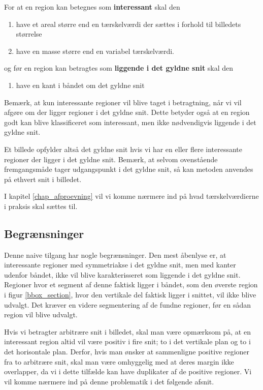 {\noindent For at en region kan betegnes som \textbf{interessant} skal den
\begin{enumerate}
        \renewcommand{\labelenumi}{(\alph{enumi})}
    \item have et areal større end en tærskelværdi der sættes i
        forhold til billedets størrelse
    \item have en masse større end en variabel tærskelværdi.
\end{enumerate}
og før en region kan betragtes som \textbf{liggende i det gyldne
snit} skal den
\begin{enumerate}
        \renewcommand{\labelenumi}{(\alph{enumi})}
        \setcounter{enumi}{2}
    \item have en kant i båndet om det gyldne snit
\end{enumerate}

Bemærk, at kun interessante regioner vil blive taget i betragtning, når vi vil
afgøre om der ligger regioner i det gyldne snit. Dette betyder også at
en region godt kan blive klassificeret som interessant, men ikke
nødvendigvis liggende i det gyldne snit.

Et billede opfylder altså det gyldne snit hvis vi har en eller flere
interessante regioner der ligger i det gyldne snit. Bemærk, at selvom
ovenstående fremgangsmåde tager udgangspunkt i det gyldne snit, så kan
metoden anvendes på ethvert snit i billedet.

I kapitel \ref{chap_afproevning} vil vi komme nærmere ind på hvad
tærskelværdierne i praksis skal sættes til.

\subsection{Begrænsninger}
Denne naive tilgang har nogle begrænsninger.  Den mest åbenlyse er, at
interessante regioner med symmetriakse i det gyldne snit, men med kanter udenfor
båndet, ikke vil blive karakterisseret som liggende i det gyldne snit.
Regioner hvor et segment af denne faktisk ligger i båndet, som den
øverste region i figur \ref{bbox_section}, hvor den vertikale del faktisk
ligger i snittet, vil ikke blive udvalgt.  Det kræver en videre
segmentering af de fundne regioner, før en sådan region vil blive
udvalgt.

Hvis vi betragter arbitrære snit i billedet, skal man være opmærksom på,
at en interessant region altid vil være positiv i fire snit; to i det
vertikale plan og to i det horisontale plan. Derfor, hvis man ønsker at
sammenligne positive regioner fra to arbitrære snit, skal man være
omhyggelig med at deres margin ikke overlapper, da vi i dette tilfælde
kan have duplikater af de positive regioner. Vi vil komme nærmere ind på
denne problematik i det følgende afsnit.

}


